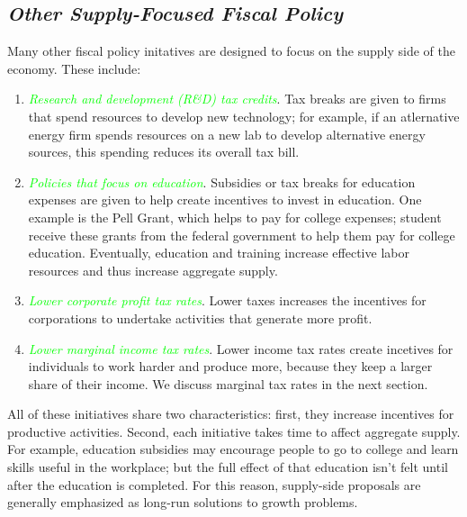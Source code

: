 \documentclass[11pt]{article} %
\begin{document}
\subsection*{\textbf{\textit{Other Supply-Focused Fiscal Policy}}}
Many other fiscal policy initatives are designed to focus on the supply side of the economy. These include:
\begin{enumerate}
\item \textit{\textcolor{lime}{Research and development (R\&D) tax credits}}. Tax breaks are given to firms that spend resources to develop new technology; for example, if an atlernative energy firm spends resources on a new lab to develop alternative energy sources, this spending reduces its overall tax bill.
\item \textit{\textcolor{lime}{Policies that focus on education}}. Subsidies or tax breaks for education expenses are given to help create incentives to invest in education. One example is the Pell Grant, which helps to pay for college expenses; student receive these grants from the federal government to help them pay for college education. Eventually, education and training increase effective labor resources and thus increase aggregate supply.
\item \textit{\textcolor{lime}{Lower corporate profit tax rates}}. Lower taxes increases the incentives for corporations to undertake activities that generate more profit.
\item \textit{\textcolor{lime}{Lower marginal income tax rates}}. Lower income tax rates create incetives for individuals to work harder and produce more, because they keep a larger share of their income. We discuss marginal tax rates in the next section.
\end{enumerate}

All of these initiatives share two characteristics: first, they increase incentives for productive activities. Second, each initiative takes time to affect aggregate supply. For example, education subsidies may encourage people to go to college and learn skills useful in the workplace; but the full effect of that education isn't felt until after the education is completed. For this reason, supply-side proposals are generally emphasized as long-run solutions to growth problems.
\end{document}
